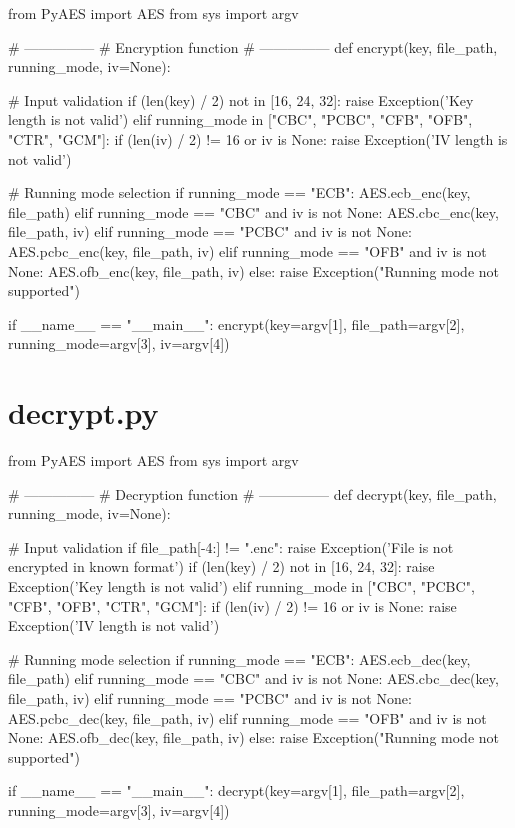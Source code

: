 \begin{python}
from PyAES import AES
from sys import argv


# ---------------
# Encryption function
# ---------------
def encrypt(key, file_path, running_mode, iv=None):

    # Input validation
    if (len(key) / 2) not in [16, 24, 32]:
        raise Exception('Key length is not valid')
    elif running_mode in ["CBC", "PCBC", "CFB", "OFB", "CTR", "GCM"]:
        if (len(iv) / 2) != 16 or iv is None:
            raise Exception('IV length is not valid')

    # Running mode selection
    if running_mode == "ECB":
        AES.ecb_enc(key, file_path)
    elif running_mode == "CBC" and iv is not None:
        AES.cbc_enc(key, file_path, iv)
    elif running_mode == "PCBC" and iv is not None:
        AES.pcbc_enc(key, file_path, iv)
    elif running_mode == "OFB" and iv is not None:
        AES.ofb_enc(key, file_path, iv)
    else:
        raise Exception("Running mode not supported")


if __name__ == "__main__":
    encrypt(key=argv[1], file_path=argv[2], running_mode=argv[3], iv=argv[4])

\end{python}

\section{decrypt.py}
\label{app:decrypt.py}

\begin{python}
from PyAES import AES
from sys import argv


# ---------------
# Decryption function
# ---------------
def decrypt(key, file_path, running_mode, iv=None):

    # Input validation
    if file_path[-4:] != ".enc":
        raise Exception('File is not encrypted in known format')
    if (len(key) / 2) not in [16, 24, 32]:
        raise Exception('Key length is not valid')
    elif running_mode in ["CBC", "PCBC", "CFB", "OFB", "CTR", "GCM"]:
        if (len(iv) / 2) != 16 or iv is None:
            raise Exception('IV length is not valid')

    # Running mode selection
    if running_mode == "ECB":
        AES.ecb_dec(key, file_path)
    elif running_mode == "CBC" and iv is not None:
        AES.cbc_dec(key, file_path, iv)
    elif running_mode == "PCBC" and iv is not None:
        AES.pcbc_dec(key, file_path, iv)
    elif running_mode == "OFB" and iv is not None:
        AES.ofb_dec(key, file_path, iv)
    else:
        raise Exception("Running mode not supported")


if __name__ == "__main__":
    decrypt(key=argv[1], file_path=argv[2], running_mode=argv[3], iv=argv[4])

\end{python}

